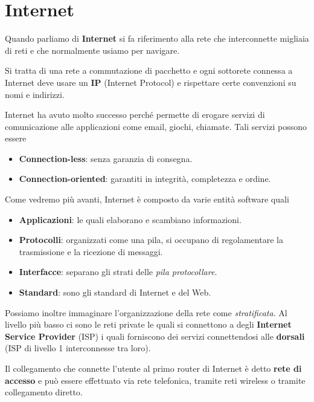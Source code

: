 \section{Internet}
Quando parliamo di \textbf{Internet} si fa riferimento alla rete che 
interconnette migliaia di reti e che normalmente usiamo per navigare.

Si tratta di una rete a commutazione di pacchetto e ogni sottorete
connessa a Internet deve usare un \textbf{IP} (Internet Protocol) e
rispettare certe convenzioni su nomi e indirizzi.

Internet ha avuto molto successo perché permette di erogare servizi 
di comunicazione alle applicazioni come email, giochi, chiamate. Tali 
servizi possono essere
\begin{itemize}
	\item \textbf{Connection-less}: senza garanzia di consegna.
	\item \textbf{Connection-oriented}: garantiti in integrità, 
		completezza e ordine.
\end{itemize}
Come vedremo più avanti, Internet è composto da varie entità software 
quali
\begin{itemize}
	\item \textbf{Applicazioni}: le quali elaborano e scambiano 
		informazioni.
	\item \textbf{Protocolli}: organizzati come una pila, si occupano 
		di regolamentare la trasmissione e la ricezione di messaggi.
	\item \textbf{Interfacce}: separano gli strati delle 
		\emph{pila protocollare}.
	\item \textbf{Standard}: sono gli standard di Internet e del Web.
\end{itemize}
Possiamo inoltre immaginare l'organizzazione della rete come
\emph{stratificata}. Al livello più basso ci sono le reti private le 
quali si connettono a degli \textbf{Internet Service Provider} (ISP)
i quali forniscono dei servizi connettendosi alle \textbf{dorsali} 
(ISP di livello 1 interconnesse tra loro).

Il collegamento che connette l'utente al primo router di Internet è 
detto \textbf{rete di accesso} e può essere effettuato via rete 
telefonica, tramite reti wireless o tramite collegamento diretto.

